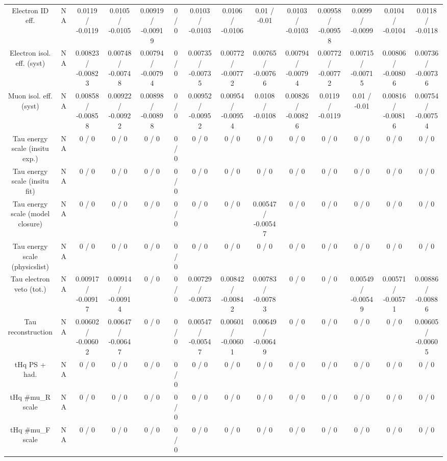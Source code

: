\documentclass[10pt]{article}
\begin{document}
\begin{table}[htbp]
\begin{center}
\begin{tabular}{|c|c|c|c|c|c|c|c|c|c|c|c|c|c|}
  Electron ID eff. &    NA    & 0.0119 / -0.0119 & 0.0105 / -0.0105 & 0.00919 / -0.00919 & 0 / 0 & 0.0103 / -0.0103 & 0.0106 / -0.0106 & 0.01 / -0.01 & 0.0103 / -0.0103 & 0.00958 / -0.00958 & 0.0099 / -0.0099 & 0.0104 / -0.0104 & 0.0118 / -0.0118 \\ 
  Electron isol. eff. (syst) &    NA    & 0.00823 / -0.00823 & 0.00748 / -0.00748 & 0.00794 / -0.00794 & 0 / 0 & 0.00735 / -0.00735 & 0.00772 / -0.00772 & 0.00765 / -0.00766 & 0.00794 / -0.00794 & 0.00772 / -0.00772 & 0.00715 / -0.00715 & 0.00806 / -0.00806 & 0.00736 / -0.00736 \\ 
  Muon isol. eff. (syst) &    NA    & 0.00858 / -0.00858 & 0.00922 / -0.00922 & 0.00898 / -0.00898 & 0 / 0 & 0.00952 / -0.00952 & 0.00954 / -0.00954 & 0.0108 / -0.0108 & 0.00826 / -0.00826 & 0.0119 / -0.0119 & 0.01 / -0.01 & 0.00816 / -0.00816 & 0.00754 / -0.00754 \\ 
  Tau energy scale (insitu exp.) &    NA    & 0 / 0 & 0 / 0 & 0 / 0 & 0 / 0 & 0 / 0 & 0 / 0 & 0 / 0 & 0 / 0 & 0 / 0 & 0 / 0 & 0 / 0 & 0 / 0 \\ 
  Tau energy scale (insitu fit) &    NA    & 0 / 0 & 0 / 0 & 0 / 0 & 0 / 0 & 0 / 0 & 0 / 0 & 0 / 0 & 0 / 0 & 0 / 0 & 0 / 0 & 0 / 0 & 0 / 0 \\ 
  Tau energy scale (model closure) &    NA    & 0 / 0 & 0 / 0 & 0 / 0 & 0 / 0 & 0 / 0 & 0 / 0 & 0.00547 / -0.00547 & 0 / 0 & 0 / 0 & 0 / 0 & 0 / 0 & 0 / 0 \\ 
  Tau energy scale (physicslist) &    NA    & 0 / 0 & 0 / 0 & 0 / 0 & 0 / 0 & 0 / 0 & 0 / 0 & 0 / 0 & 0 / 0 & 0 / 0 & 0 / 0 & 0 / 0 & 0 / 0 \\ 
  Tau electron veto (tot.) &    NA    & 0.00917 / -0.00917 & 0.00914 / -0.00914 & 0 / 0 & 0 / 0 & 0.00729 / -0.0073 & 0.00842 / -0.00842 & 0.00783 / -0.00783 & 0 / 0 & 0 / 0 & 0.00549 / -0.00549 & 0.00571 / -0.00571 & 0.00886 / -0.00886 \\ 
  Tau reconstruction &    NA    & 0.00602 / -0.00602 & 0.00647 / -0.00647 & 0 / 0 & 0 / 0 & 0.00547 / -0.00547 & 0.00601 / -0.00601 & 0.00649 / -0.00649 & 0 / 0 & 0 / 0 & 0 / 0 & 0 / 0 & 0.00605 / -0.00605 \\ 
  tHq PS + had. &    NA    & 0 / 0 & 0 / 0 & 0 / 0 & 0 / 0 & 0 / 0 & 0 / 0 & 0 / 0 & 0 / 0 & 0 / 0 & 0 / 0 & 0 / 0 & 0 / 0 \\ 
  tHq #mu_{R} scale &    NA    & 0 / 0 & 0 / 0 & 0 / 0 & 0 / 0 & 0 / 0 & 0 / 0 & 0 / 0 & 0 / 0 & 0 / 0 & 0 / 0 & 0 / 0 & 0 / 0 \\ 
  tHq #mu_{F} scale &    NA    & 0 / 0 & 0 / 0 & 0 / 0 & 0 / 0 & 0 / 0 & 0 / 0 & 0 / 0 & 0 / 0 & 0 / 0 & 0 / 0 & 0 / 0 & 0 / 0 \\ 

\end{tabular}
\end{center}
\end{table}
\end{document}
